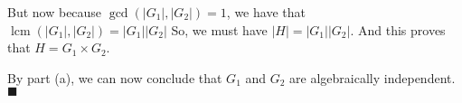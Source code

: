 \documentclass{book}
\newcommand{\hTwo}{%
\color{Black}%
   \fontsize{13}{15}\selectfont%
}
\newenvironment{myIndent}{%
   \begin{adjustwidth}{2.5em}{0em}%
}{%
   \end{adjustwidth}%
}
\DeclareMathOperator{\lcm}{lcm}
\newcommand{\mySepTwo}[1][.]{%
   {\noindent\color{#1}{\rule{6.5in}{0.5mm}}}\\%
}
\newcommand{\retTwo}{\hfill\bigbreak}
\begin{document}
\begin{enumerate}
\begin{myIndent}
		But now because $\gcd(|G_1|, |G_2|) = 1$, we have that $\lcm(|G_1|, |G_2|) = |G_1||G_2|$ So, we must have $|H| = |G_1||G_2|$. And this proves that $H = G_1 \times G_2$.\newpage

		By part (a), we can now conclude that $G_1$ and $G_2$ are algebraically independent. $\blacksquare$\retTwo
	\end{myIndent}
\end{enumerate}

\mySepTwo

\hTwo


\hypertarget{Folland Proposition 10.1}{}
\hypertarget{bib citation 12}{}
\hypertarget{math 241a lecture 3}{}
\hypertarget{math 200a lecture 4}{}
\hypertarget{math 220a lecture 3}{}
\hypertarget{bib citation 13}{}
\hypertarget{page idk 1 reference}{}
\end{document}
